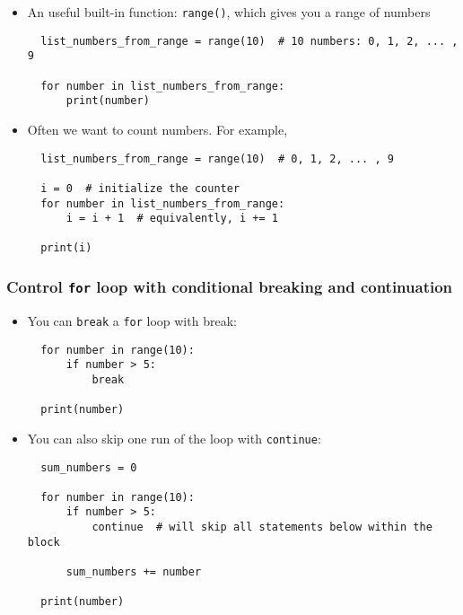 \documentclass[10pt,article]{article}
\begin{document}
\begin{itemize}
\item An useful built-in function: \texttt{range()}, which gives you a range of numbers
\begin{verbatim}
  list_numbers_from_range = range(10)  # 10 numbers: 0, 1, 2, ... , 9
  
  for number in list_numbers_from_range:
      print(number)
\end{verbatim}
\end{itemize}

\begin{itemize}
\item Often we want to count numbers. For example,

\begin{verbatim}
  list_numbers_from_range = range(10)  # 0, 1, 2, ... , 9
  
  i = 0  # initialize the counter
  for number in list_numbers_from_range:
      i = i + 1  # equivalently, i += 1

  print(i)
\end{verbatim}
\end{itemize}
\subsubsection{Control \texttt{for} loop with conditional breaking and continuation}
\label{sec:orge66a623}
\begin{itemize}
\item You can \texttt{break} a \texttt{for} loop with break:

\begin{verbatim}
  for number in range(10):
      if number > 5:
          break

  print(number)
\end{verbatim}
\end{itemize}

\begin{itemize}
\item You can also skip one run of the loop with \texttt{continue}:

\begin{verbatim}
  sum_numbers = 0

  for number in range(10):
      if number > 5:
          continue  # will skip all statements below within the block

      sum_numbers += number

  print(number)
\end{verbatim}
\end{itemize}
\end{document}
